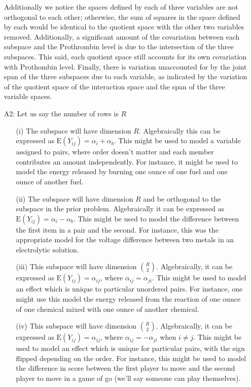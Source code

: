 \documentclass[11pt]{article}
\newcommand{\E}{\mathrm{E}}
\theoremstyle{definition}
\begin{document}
\begin{itemize}
        Additionally we notice the spaces defined by each of three variables are not orthogonal to each other; otherwise, the sum of squares in the space defined by each would be identical to the quotient space with the other two variables removed. Additionally, a significant amount of the covariation between each subspace and the Prothrombin level is due to the intersection of the three subspaces. This said, each quotient space still accounts for its own covariation with Prothombin level. Finally, there is variation unaccounted for by the joint span of the three subspaces due to each variable, as indicated by the variation of the quotient space of the interaction space and the span of the three variable spaces.
    \item[A2:]
        Let us say the number of rows is $R$ \\
        \begin{itemize}
            \item[(i)] 
                The subspace will have dimension $R$.
                Algebraically this can be expressed as \(\E(Y_{ij})=\alpha_i+\alpha_b\). 
                This might be used to model a variable assigned to pairs, where order doesn't matter and each member contributes an amount independently. For instance, it might be used to model the energy released by burning one ounce of one fuel and one ounce of another fuel.
            \item[(ii)] 
                The subspace will have dimension $R$ and be orthogonal to the subspace in the prior problem. Algebraically it can be expressed as \(\E(Y_{ij})=\alpha_i-\alpha_b\). This might be used to model the difference between the first item in a pair and the second. For instance, this was the appropriate model for the voltage difference between two metals in an electrolytic solution.
            \item[(iii)] This subspace will have dimension ${R \choose 2}$. Algebraically, it can be expressed as $\E(Y_{ij})=\alpha_{ij}$, where $\alpha_{ij}=\alpha_{ji}$. This might be used to model an effect which is unique to particular unordered pairs. For instance, one might use this model the energy released from the reaction of one ounce of one chemical mixed with one ounce of another chemical.
            \item[(iv)] This subspace will have dimension ${R \choose 2}$. Algebraically, it can be expressed as $\E(Y_{ij})=\alpha_{ij}$, where $\alpha_{ij}=-\alpha_{ji}$ when $i\neq j$. This might be used to model an effect which is unique for particular pairs, with the sign flipped depending on the order. For instance, this might be used to model the difference in score between the first player to move and the second player to move in a game of go (we'll say someone can play themselves). 
        \end{itemize}
\end{itemize}
\end{document}
